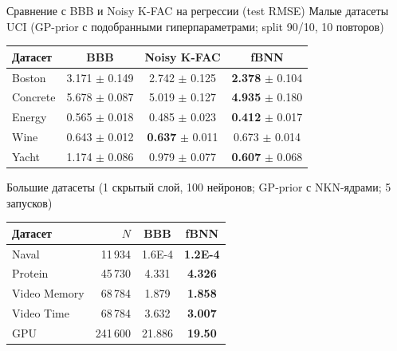 \documentclass[aspectratio=169,9pt]{beamer}
\begin{document}
\begin{frame}{Сравнение с BBB и Noisy K-FAC на регрессии (test RMSE)}
  \small
  \textcolor{structure}{Малые датасеты UCI} (GP-prior с подобранными гиперпараметрами; split 90/10, 10 повторов)
  \begin{center}
  \begin{tabular}{lccc}
    \toprule
    Датасет & BBB & Noisy K-FAC & fBNN \\
    \midrule
    Boston   & 3.171 $\pm$ 0.149 & 2.742 $\pm$ 0.125 & \textbf{2.378} $\pm$ 0.104 \\
    Concrete & 5.678 $\pm$ 0.087 & 5.019 $\pm$ 0.127 & \textbf{4.935} $\pm$ 0.180 \\
    Energy   & 0.565 $\pm$ 0.018 & 0.485 $\pm$ 0.023 & \textbf{0.412} $\pm$ 0.017 \\
    Wine     & 0.643 $\pm$ 0.012 & \textbf{0.637} $\pm$ 0.011 & 0.673 $\pm$ 0.014 \\
    Yacht    & 1.174 $\pm$ 0.086 & 0.979 $\pm$ 0.077 & \textbf{0.607} $\pm$ 0.068 \\
    \bottomrule
  \end{tabular}
  \end{center}
  \textcolor{structure}{Большие датасеты} (1 скрытый слой, 100 нейронов; GP-prior с NKN-ядрами; 5 запусков)
  \begin{center}
  \begin{tabular}{lrcc}
    \toprule
    Датасет & $N$ & BBB & fBNN \\
    \midrule
    Naval        & 11\,934  & 1.6E-4 & \textbf{1.2E-4} \\
    Protein      & 45\,730  & 4.331  & \textbf{4.326} \\
    Video Memory & 68\,784  & 1.879  & \textbf{1.858} \\
    Video Time   & 68\,784  & 3.632  & \textbf{3.007} \\
    GPU          & 241\,600 & 21.886 & \textbf{19.50} \\
    \bottomrule
  \end{tabular}
  \end{center}
\end{frame}
\end{document}
